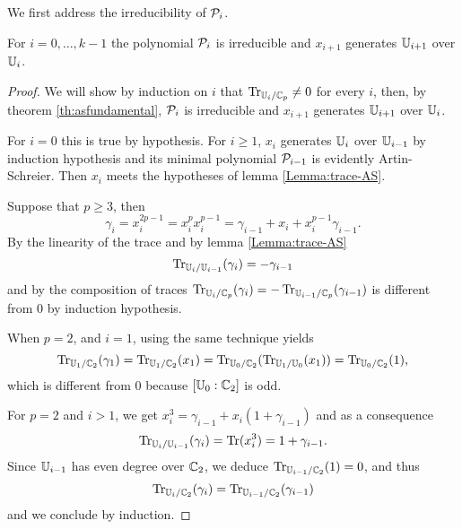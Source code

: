 We first address the irreducibility of $\mathcal{P}_i$.

\begin{lemma}
  \label{Lemma:irreducibility}
  For $i=0,\dots,k-1$ the polynomial $\mathcal{P}_i$ is
  irreducible and $x_{i+1}$ generates $\mathbb{U}_{i+1}$ over $\mathbb{U}_i$.
\end{lemma}
\begin{proof}
  We will show by induction on $i$ that $\operatorname{Tr}_{\mathbb{U}_i/\mathbb{C}_p}\ne0$ for
  every $i$, then, by theorem \ref{th:asfundamental}, $\mathcal{P}_i$ is
  irreducible and $x_{i+1}$ generates $\mathbb{U}_{i+1}$ over $\mathbb{U}_i$.
  
  For $i=0$ this is true by hypothesis. For $i \ge 1$, $x_i$ generates
  $\mathbb{U}_i$ over $\mathbb{U}_{i-1}$ by induction hypothesis and its minimal
  polynomial $\mathcal{P}_{i-1}$ is evidently Artin-Schreier. Then $x_i$
  meets the hypotheses of lemma \ref{Lemma:trace-AS}.

  Suppose that $p\ge3$, then
  \begin{equation*}
    \gamma_i=x_i^{2p-1}  = x_i^px_i^{p-1} =
    \gamma_{i-1} + x_i + x_i^{p-1} \gamma_{i-1}\text{.}
  \end{equation*}
  By the linearity of the trace and by lemma \ref{Lemma:trace-AS}
  \begin{equation}
    \label{eq:trace>2}
    \operatorname{Tr}_{\mathbb{U}_i/\mathbb{U}_{i-1}}(\gamma_i) = -\gamma_{i-1}
  \end{equation}
  and by the composition of traces $\operatorname{Tr}_{\mathbb{U}_i/\mathbb{C}_p}(\gamma_i) =
  -\operatorname{Tr}_{\mathbb{U}_{i-1}/\mathbb{C}_p}(\gamma_{i-1})$ is different from $0$ by induction
  hypothesis.

  When $p=2$, and $i=1$, using the same technique yields
  \begin{equation}
    \label{eq:trace=2,1}
    \operatorname{Tr}_{\mathbb{U}_1/\mathbb{C}_2}(\gamma_1)= \operatorname{Tr}_{\mathbb{U}_1/\mathbb{C}_2}(x_1)=
    \operatorname{Tr}_{\mathbb{U}_0/\mathbb{C}_2}(\operatorname{Tr}_{\mathbb{U}_1/\mathbb{U}_0}(x_1))= \operatorname{Tr}_{\mathbb{U}_0/\mathbb{C}_2}(1)\text{,}
  \end{equation}
  which is different from $0$ because $[\mathbb{U}_0:\mathbb{C}_2]$ is odd.

  For $p=2$ and $i > 1$, we get $x_i^{3} = \gamma_{i-1} + x_i (1+
  \gamma_{i-1})$ and as a consequence
  \begin{equation}
    \label{eq:trace=2}
    \operatorname{Tr}_{\mathbb{U}_i/\mathbb{U}_{i-1}}(\gamma_i)=\operatorname{Tr}(x_i^3)=1+\gamma_{i-1}
    \text{.}
  \end{equation}
  Since $\mathbb{U}_{i-1}$ has even degree over $\mathbb{C}_2$, we deduce
  $\operatorname{Tr}_{\mathbb{U}_{i-1}/\mathbb{C}_2}(1)=0$, and thus
  \[\operatorname{Tr}_{\mathbb{U}_{i}/\mathbb{C}_2}(\gamma_i)=\operatorname{Tr}_{\mathbb{U}_{i-1}/\mathbb{C}_2}(\gamma_{i-1})\]
  and we conclude by induction.
\end{proof}


